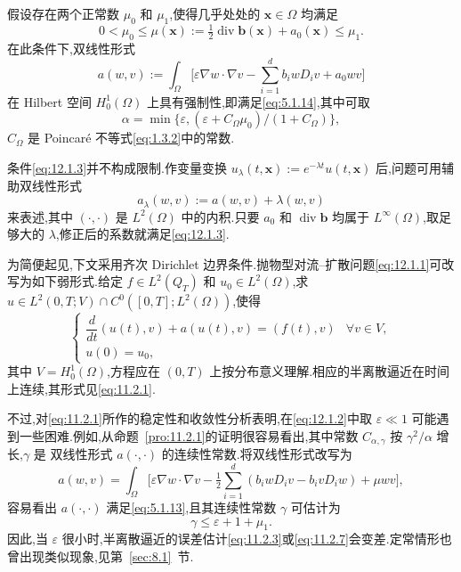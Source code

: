 假设存在两个正常数 \(\mu_0\) 和 \(\mu_1\),使得几乎处处的 \(\boldsymbol{x}\in\Omega\) 均满足
\begin{equation}\label{eq:12.1.3}
  0<\mu_0\le\mu(\boldsymbol{x})
    :=\tfrac12\operatorname{div}\boldsymbol{b}(\boldsymbol{x})+a_0(\boldsymbol{x})
    \le\mu_1.
\end{equation}
在此条件下,双线性形式
\begin{equation}\label{eq:12.1.4}
  a(w,v):=\int_\Omega
    \biggl[\varepsilon\nabla w\cdot\nabla v-\sum_{i=1}^d b_iwD_iv+a_0wv\biggr]
\end{equation}
在 Hilbert 空间 \(H_0^1(\Omega)\) 上具有强制性,即满足\eqref{eq:5.1.14},其中可取
\[
  \alpha=\min\bigl\{\varepsilon,
    (\varepsilon+C_\Omega\mu_0)/(1+C_\Omega)\bigr\},
\]
\(C_\Omega\) 是 Poincaré 不等式\eqref{eq:1.3.2}中的常数.

条件\eqref{eq:12.1.3}并不构成限制.作变量变换 \(u_\lambda(t,\boldsymbol{x}):=e^{-\lambda t}u(t,\boldsymbol{x})\) 后,问题可用辅助双线性形式
\[
  a_\lambda(w,v):=a(w,v)+\lambda(w,v)
\]
来表述,其中 \((\cdot,\cdot)\) 是 \(L^2(\Omega)\) 中的内积.只要 \(a_0\) 和 \(\operatorname{div}\boldsymbol{b}\) 均属于 \(L^\infty(\Omega)\),取足够大的 \(\lambda\),修正后的系数就满足\eqref{eq:12.1.3}.

为简便起见,下文采用齐次 Dirichlet 边界条件.抛物型对流--扩散问题\eqref{eq:12.1.1}可改写为如下弱形式.给定 \(f\in L^2(Q_T)\) 和 \(u_0\in L^2(\Omega)\),求 \(u\in L^2(0,T;V)\cap C^0([0,T];L^2(\Omega))\),使得
\begin{equation}\label{eq:12.1.5}
  \begin{cases}
    \dfrac{d}{dt}(u(t),v)+a(u(t),v)=(f(t),v)
      & \forall v\in V,\\[2pt]
    u(0)=u_0,
  \end{cases}
\end{equation}
其中 \(V=H_0^1(\Omega)\),方程应在 \((0,T)\) 上按分布意义理解.相应的半离散逼近在时间上连续,其形式见\eqref{eq:11.2.1}.

不过,对\eqref{eq:11.2.1}所作的稳定性和收敛性分析表明,在\eqref{eq:12.1.2}中取 \(\varepsilon\ll1\) 可能遇到一些困难.例如,从命题~\ref{pro:11.2.1}的证明很容易看出,其中常数 \(C_{\alpha,\gamma}\) 按 \(\gamma^2/\alpha\) 增长,\(\gamma\) 是
双线性形式 \(a(\cdot,\cdot)\) 的连续性常数.将双线性形式改写为
\begin{equation}\label{eq:12.1.6}
  a(w,v)=\int_\Omega\biggl[\varepsilon\nabla w\cdot\nabla v
    -\tfrac12\sum_{i=1}^d(b_iwD_iv-b_ivD_iw)+\mu wv\biggr],
\end{equation}
容易看出 \(a(\cdot,\cdot)\) 满足\eqref{eq:5.1.13},且其连续性常数 \(\gamma\) 可估计为
\[
  \gamma\le\varepsilon+1+\mu_1.
\]
因此,当 \(\varepsilon\) 很小时,半离散逼近的误差估计\eqref{eq:11.2.3}或\eqref{eq:11.2.7}会变差.定常情形也曾出现类似现象,见第~\ref{sec:8.1}~节.

